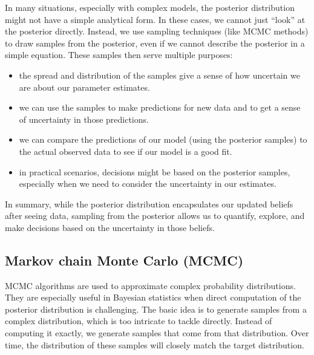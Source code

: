 \documentclass[letterpaper,10pt,english]{jupyterBook}
\begin{document}
\sphinxAtStartPar
In many situations, especially with complex models, the posterior distribution might not have a simple analytical form. In these cases, we cannot just “look” at the posterior directly. Instead, we use sampling techniques (like MCMC methods) to draw samples from the posterior, even if we cannot describe the posterior in a simple equation. These samples then serve multiple purposes:
\begin{itemize}
\item {} 
\sphinxAtStartPar
{} the spread and distribution of the samples give a sense of how uncertain we are about our parameter estimates.

\item {} 
\sphinxAtStartPar
{} we can use the samples to make predictions for new data and to get a sense of uncertainty in those predictions.

\item {} 
\sphinxAtStartPar
{} we can compare the predictions of our model (using the posterior samples) to the actual observed data to see if our model is a good fit.

\item {} 
\sphinxAtStartPar
{} in practical scenarios, decisions might be based on the posterior samples, especially when we need to consider the uncertainty in our estimates.

\end{itemize}

\sphinxAtStartPar
In summary, while the posterior distribution encapsulates our updated beliefs after seeing data, sampling from the posterior allows us to quantify, explore, and make decisions based on the uncertainty in those beliefs.


\subsection{Markov chain Monte Carlo (MCMC)}
\label{\detokenize{notebooks/review_stats:markov-chain-monte-carlo-mcmc}}
\sphinxAtStartPar
MCMC algorithms are used to approximate complex probability distributions. They are especially useful in Bayesian statistics when direct computation of the posterior distribution is challenging. The basic idea is to generate samples from a complex distribution, which is too intricate to tackle directly. Instead of computing it exactly, we generate samples that come from that distribution. Over time, the distribution of these samples will closely match the target distribution.
\end{document}
